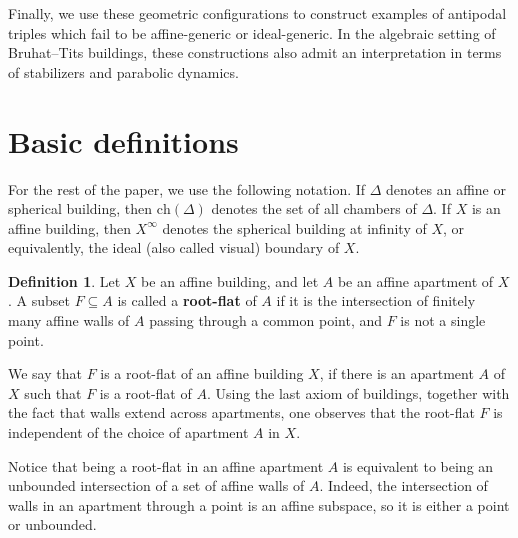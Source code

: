 \documentclass[11pt]{amsart}
\newcommand{\Ch}{\mathrm{ch}}
\theoremstyle{plain}
\theoremstyle{definition}
\newtheorem{Def}[thm]{Definition}
\theoremstyle{remark}
\begin{document}
	Finally, we use these geometric configurations to construct examples of antipodal triples which fail to be affine-generic or ideal-generic. In the algebraic setting of Bruhat--Tits buildings, these constructions also admit an interpretation in terms of stabilizers and parabolic dynamics.
	
	\section{Basic definitions}
	\label{section::opposite_ideal_ch}
	
	For the rest of the paper, we use the following notation. If $\Delta$ denotes an affine or spherical building, then $\Ch(\Delta)$ denotes the set of all chambers of $\Delta$. If $X$ is an affine building, then $X^\infty$ denotes the spherical building at infinity of $X$, or equivalently, the ideal (also called visual) boundary of $X$.
	
	\begin{Def}
		\label{def::affine_flat} 
		Let \( X \) be an affine building, and let $A$ be an affine apartment of $X$. A subset $F \subseteq A$ is called a \textbf{root-flat} of $A$ if it is the intersection of finitely many affine walls of $A$ passing through a common point, and $F$ is not a single point.
		
		We say that $F$ is a root-flat of an affine building $X$, if there is an apartment $A$ of $X$ such that $F$ is a root-flat of $A$. Using the last axiom of buildings, together with the fact that walls extend across apartments, one observes that the root-flat $F$ is independent of the choice of apartment $A$ in $X$.
	\end{Def}		
	
	Notice that being a root-flat in an affine apartment $A$ is equivalent to being an unbounded intersection of a set of affine walls of $A$. Indeed, the intersection of walls in an apartment through a point is an affine subspace, so it is either a point or unbounded. 
	
\end{document}
